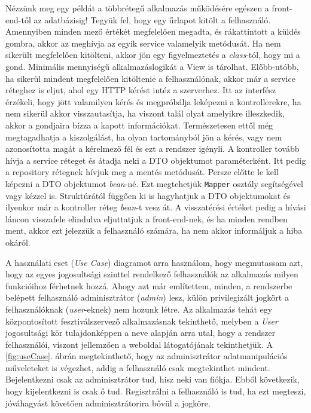 Nézzünk meg egy példát a többrétegű alkalmazás működésére egészen a front-end-től az adatbázisig!
Tegyük fel, hogy egy űrlapot kitölt a felhasználó. Amennyiben minden mező értékét megfelelően megadta, és rákattintott a küldés gombra, akkor az meghívja az egyik service valamelyik metódusát. Ha nem sikerült megfelelően kitölteni, akkor jön egy figyelmeztetés a \textit{class}-tól, hogy mi a gond. Minimális mennyiségű alkalmazáslogikát a View is tárolhat. Előbb-utóbb, ha sikerül mindent megfelelően kitöltenie a felhasználónak, akkor már a service réteghez is eljut, ahol egy HTTP kérést intéz a szerverhez. Itt az interfész érzékeli, hogy jött valamilyen kérés és megpróbálja leképezni a kontrollerekre, ha nem sikerül akkor visszautasítja, ha viszont talál olyat amelyikre illeszkedik, akkor a gondjaira bízza a kapott információkat. Természetesen ettől még megtagadhatja a kiszolgálást, ha olyan tartományból jön a kérés, vagy nem azonosította magát a kérelmező fél és ezt a rendszer igényli. A kontroller tovább hívja a service réteget és átadja neki a DTO objektumot paraméterként. Itt pedig a repository rétegnek hívjuk meg a mentés metódusát. Persze előtte le kell képezni a DTO objektumot \textit{bean}-né. Ezt megtehetjük \texttt{Mapper} osztály segítségével vagy kézzel is. Struktúrától függően ki is hagyhatjuk a DTO objektumokat és ilyenkor már a kontroller réteg \textit{bean}-t vesz át. A visszatérési értéket pedig a hívási láncon visszafele elindulva eljuttatjuk a front-end-nek, és ha minden rendben ment, akkor ezt jelezzük a felhasználó számára, ha nem akkor informáljuk a hiba okáról.
 

A használati eset (\textit{Use Case}) diagramot arra használom, hogy megmutassam azt, hogy az egyes jogosultsági szinttel rendelkező felhasználók az alkalmazás milyen funkcióihoz férhetnek hozzá. Ahogy azt már említettem, minden, a rendszerbe belépett felhasználó adminisztrátor (\textit{admin}) lesz, külön privilegizált jogkört a felhasználóknak (\textit{user}-eknek) nem hozunk létre. Az alkalmazás tehát egy központosított fesztiválszervező alkalmazásnak tekinthető, melyben a \textit{User} jogosultsági kör tulajdonképpen a neve alapján arra utal, hogy a rendszer felhasználói, viszont jellemzően a weboldal látogatójának tekinthetjük. A \ref{fig:useCase}. ábrán megtekinthető, hogy az adminisztrátor adatmanipulációs műveleteket is végezhet, addig a felhasználó csak megtekinthet mindent. Bejelentkezni csak az adminisztrátor tud, hisz neki van fiókja. Ebből következik, hogy kijelentkezni is csak ő tud. Regisztrálni a felhasználó is tud, ha ezt megteszi, jóváhagyást követően adminisztrátorira bővül a jogköre.

